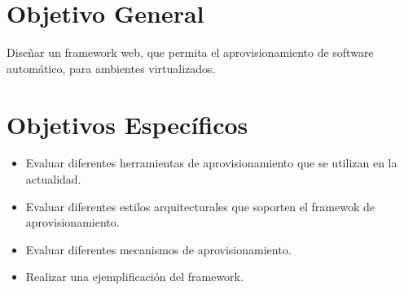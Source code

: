 \section{Objetivo General}
Diseñar un framework web, que permita el aprovisionamiento de software automático, para ambientes virtualizados.

\section{Objetivos Específicos}
\begin{itemize}
\item Evaluar diferentes herramientas de aprovisionamiento que se utilizan en la actualidad.
\item Evaluar diferentes estilos arquitecturales que soporten el framewok de aprovisionamiento.
\item Evaluar diferentes mecanismos de aprovisionamiento.
\item Realizar una ejemplificación del framework.
\end{itemize}

